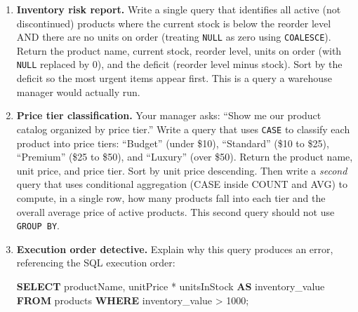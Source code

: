 \documentclass[
  letterpaper,
  DIV=11,
  numbers=noendperiod]{scrreprt}
\newenvironment{Shaded}{\begin{snugshade}}{\end{snugshade}}
\newcommand{\DecValTok}[1]{\textcolor[rgb]{0.68,0.00,0.00}{#1}}
\newcommand{\KeywordTok}[1]{\textcolor[rgb]{0.00,0.23,0.31}{\textbf{#1}}}
\newcommand{\NormalTok}[1]{\textcolor[rgb]{0.00,0.23,0.31}{#1}}
\newcommand{\OperatorTok}[1]{\textcolor[rgb]{0.37,0.37,0.37}{#1}}
\begin{document}
\begin{enumerate}
\def\labelenumi{\arabic{enumi}.}
\item
  \textbf{Inventory risk report.} Write a single query that identifies
  all active (not discontinued) products where the current stock is
  below the reorder level AND there are no units on order (treating
  \texttt{NULL} as zero using \texttt{COALESCE}). Return the product
  name, current stock, reorder level, units on order (with \texttt{NULL}
  replaced by 0), and the deficit (reorder level minus stock). Sort by
  the deficit so the most urgent items appear first. This is a query a
  warehouse manager would actually run.
\item
  \textbf{Price tier classification.} Your manager asks: ``Show me our
  product catalog organized by price tier.'' Write a query that uses
  \texttt{CASE} to classify each product into price tiers: ``Budget''
  (under \$10), ``Standard'' (\$10 to \$25), ``Premium'' (\$25 to \$50),
  and ``Luxury'' (over \$50). Return the product name, unit price, and
  price tier. Sort by unit price descending. Then write a \emph{second}
  query that uses conditional aggregation (CASE inside COUNT and AVG) to
  compute, in a single row, how many products fall into each tier and
  the overall average price of active products. This second query should
  not use \texttt{GROUP\ BY}.
\item
  \textbf{Execution order detective.} Explain why this query produces an
  error, referencing the SQL execution order:

  \begin{codelisting}

  \caption{\texttt{duckdb}}

\begin{Shaded}
\begin{Highlighting}[]
\KeywordTok{SELECT}
\NormalTok{    productName,}
\NormalTok{    unitPrice }\OperatorTok{*}\NormalTok{ unitsInStock }\KeywordTok{AS}\NormalTok{ inventory\_value}
\KeywordTok{FROM}\NormalTok{ products}
\KeywordTok{WHERE}\NormalTok{ inventory\_value }\OperatorTok{\textgreater{}} \DecValTok{1000}\NormalTok{;}
\end{Highlighting}
\end{Shaded}

  \end{codelisting}


\end{enumerate}
\end{document}
